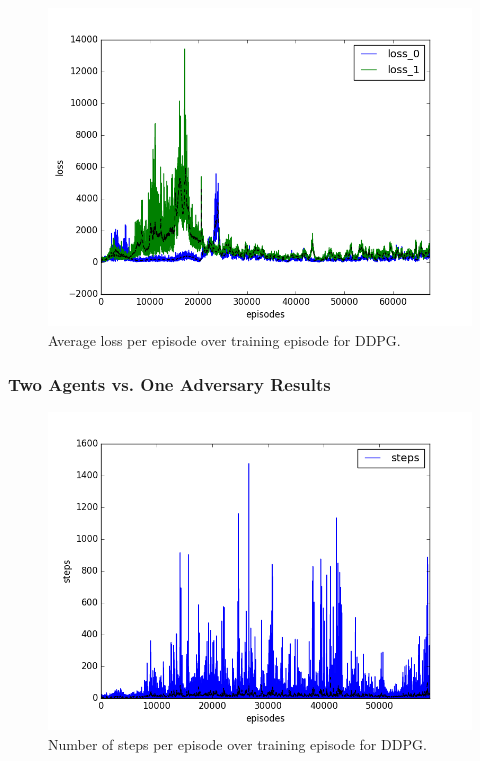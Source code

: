 \begin{figure}[h]
  \centering
  \includegraphics[trim=10 10 10 10,clip,width=\figscale\linewidth]
  {../results/ddpg_1vs1/loss.png}
  \caption{Average loss per episode over training episode for DDPG.}
  \label{fig:ddpg-1vs1}
\end{figure}
\FloatBarrier


\subsubsection{Two Agents vs. One Adversary Results}
\label{sec:experiment:ddpg:1vs2}


\begin{figure}[h]
  \centering
  \includegraphics[trim=10 10 10 10,clip,width=\figscale\linewidth]
  {../results/ddpg_1vs2/steps.png}
  \caption{Number of steps per episode over training episode for DDPG.}
  \label{fig:ddpg-1vs2}
\end{figure}
\FloatBarrier


